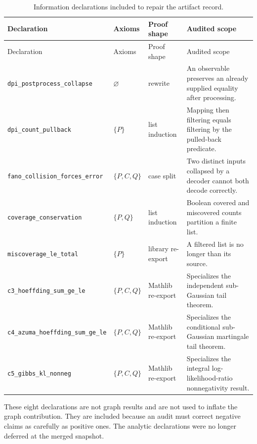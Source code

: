 \documentclass[10pt,letterpaper]{article}
\theoremstyle{definition}
\newcommand{\none}{\(\varnothing\)}
\newcommand{\decl}[1]{\nolinkurl{#1}}
\begin{document}
\begin{longtable}{@{}L{0.34\textwidth}L{0.13\textwidth}L{0.18\textwidth}L{0.27\textwidth}@{}}
\caption{Information declarations included to repair the artifact record.}
\label{tab:info-ledger}\\
\toprule
Declaration & Axioms & Proof shape & Audited scope \\
\midrule
\endfirsthead
\toprule
Declaration & Axioms & Proof shape & Audited scope \\
\midrule
\endhead
\decl{dpi_postprocess_collapse} &
\none & rewrite &
An observable preserves an already supplied equality after processing. \\
\decl{dpi_count_pullback} &
\(\{P\}\) & list induction &
Mapping then filtering equals filtering by the pulled-back predicate. \\
\decl{fano_collision_forces_error} &
\(\{P,C,Q\}\) & case split &
Two distinct inputs collapsed by a decoder cannot both decode correctly. \\
\decl{coverage_conservation} &
\(\{P,Q\}\) & list induction &
Boolean covered and miscovered counts partition a finite list. \\
\decl{miscoverage_le_total} &
\(\{P\}\) & library re-export &
A filtered list is no longer than its source. \\
\decl{c3_hoeffding_sum_ge_le} &
\(\{P,C,Q\}\) & Mathlib re-export &
Specializes the independent sub-Gaussian tail theorem. \\
\decl{c4_azuma_hoeffding_sum_ge_le} &
\(\{P,C,Q\}\) & Mathlib re-export &
Specializes the conditional sub-Gaussian martingale tail theorem. \\
\decl{c5_gibbs_kl_nonneg} &
\(\{P,C,Q\}\) & Mathlib re-export &
Specializes the integral log-likelihood-ratio nonnegativity result. \\
\bottomrule
\end{longtable}

These eight declarations are not graph results and are not used to inflate the
graph contribution. They are included because an audit must correct negative
claims as carefully as positive ones. The analytic declarations were no longer
deferred at the merged snapshot.
\end{document}
